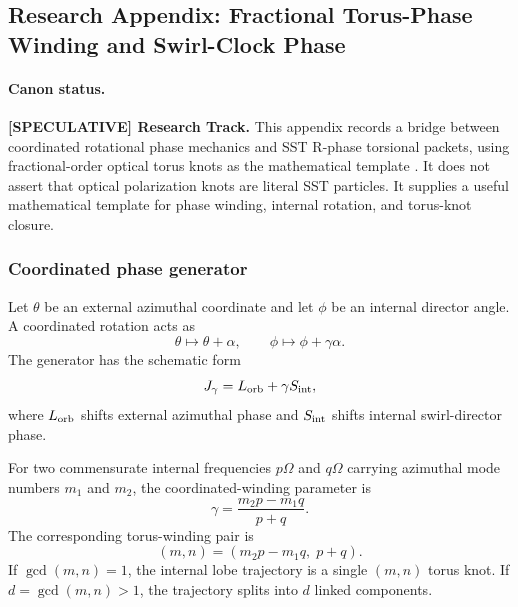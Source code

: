 \subsection{Research Appendix: Fractional Torus-Phase Winding and Swirl-Clock Phase}
\label{app:fractional_torus_phase}

\paragraph{Canon status.}
\textbf{[SPECULATIVE] Research Track.}
This appendix records a bridge between coordinated rotational phase mechanics and SST R-phase torsional packets, using fractional-order optical torus knots as the mathematical template \cite{Pisanty2018FractionalKnotsLight}. It does not assert that optical polarization knots are literal SST particles. It supplies a useful mathematical template for phase winding, internal rotation, and torus-knot closure.

\subsubsection{Coordinated phase generator}
Let $\theta$ be an external azimuthal coordinate and let $\phi$ be an internal director angle. A coordinated rotation acts as
\begin{equation}
    \theta\mapsto \theta+\alpha,
    \qquad
    \phi\mapsto \phi+\gamma\alpha.
\end{equation}
The generator has the schematic form
\begin{equation}
    J_\gamma = L_{\rm orb}+\gamma S_{\rm int},
    \label{eq:jgamma_sst}
\end{equation}
where $L_{\rm orb}$ shifts external azimuthal phase and $S_{\rm int}$ shifts internal swirl-director phase.

For two commensurate internal frequencies $p\Omega$ and $q\Omega$ carrying azimuthal mode numbers $m_1$ and $m_2$, the coordinated-winding parameter is
\begin{equation}
    \gamma
    =\frac{m_2p-m_1q}{p+q}.
    \label{eq:gamma_fractional_winding}
\end{equation}
The corresponding torus-winding pair is
\begin{equation}
    (m,n)=\left(m_2p-m_1q,\;p+q\right).
    \label{eq:torus_pair_fractional_phase}
\end{equation}
If $\gcd(m,n)=1$, the internal lobe trajectory is a single $(m,n)$ torus knot. If $d=\gcd(m,n)>1$, the trajectory splits into $d$ linked components.

